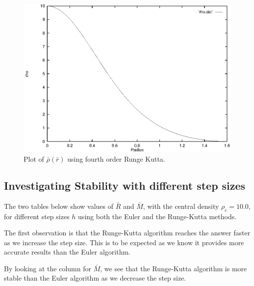 \documentclass[a4paper]{IEEEtran}
\begin{document}
    \begin{figure} 
    \caption{Plot of $\bar{\rho}(\bar{r})$ using fourth order Runge Kutta.}
    \label{fig:density-runge-kutta} 
    \begin{center}
        \includegraphics[width=\columnwidth]{figures/density-rk-01}
    \end{center}
    \end{figure} 


    \subsection{Investigating Stability with different step sizes}
    The two tables below show values of $\bar{R}$ and $\bar{M}$, with
    the central density $\rho_c = 10.0$, for different step 
    sizes $h$ using both the Euler and the Runge-Kutta methods.

    The first observation is that the Runge-Kutta algorithm reaches
    the answer faster as we increase the step size. This is to
    be expected as we know it provides more accurate results
    than the Euler algorithm.

    By looking at the column for $\bar{M}$, we see that the Runge-Kutta
    algorithm is more stable than the Euler algorithm as we decrease
    the step size.
\end{document}
